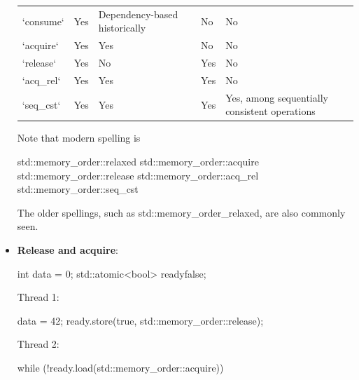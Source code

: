 \documentclass{report}
\begin{document}
\begin{itemize}
\begin{center}
\begin{tabularx}{\textwidth}{@{}XXXXX@{}}
                    `consume` & Yes & Dependency-based historically & No & No \\ [2ex]
                    `acquire` & Yes & Yes & No & No \\ [2ex]
                    `release` & Yes & No & Yes & No \\ [2ex]
                    `acq\_rel` & Yes & Yes & Yes & No \\[2ex]
                    `seq\_cst` & Yes & Yes & Yes & Yes, among sequentially consistent operations \\ 
                    \bottomrule
                \end{tabularx}
            \end{center}
            Note that modern spelling is 
            \bigbreak \noindent 
            \begin{cppcode}
                std::memory_order::relaxed
                std::memory_order::acquire
                std::memory_order::release
                std::memory_order::acq_rel
                std::memory_order::seq_cst
            \end{cppcode}
            \bigbreak \noindent 
            The older spellings, such as std::memory\_order\_relaxed, are also commonly seen.
        \item \textbf{Release and acquire}: 
            \bigbreak \noindent 
            \begin{cppcode}
                int data = 0;
                std::atomic<bool> ready{false};
            \end{cppcode}
            \bigbreak \noindent 
            Thread 1: 
            \bigbreak \noindent 
            \begin{cppcode}
                data = 42;
                ready.store(true, std::memory_order::release);
            \end{cppcode}
            \bigbreak \noindent 
            Thread 2:
            \bigbreak \noindent 
            \begin{cppcode}
                while (!ready.load(std::memory_order::acquire)) {
                }


\end{cppcode}
\end{itemize}
\end{document}
